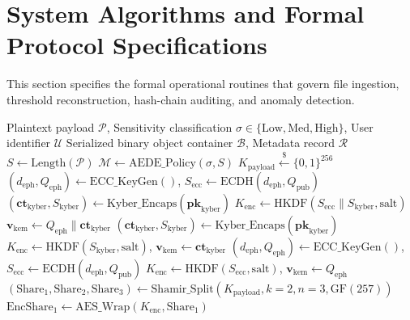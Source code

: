 \documentclass[sn-mathphys,Numbered]{sn-jnl}%
\theoremstyle{thmstyleone}%
\theoremstyle{thmstyletwo}%
\theoremstyle{thmstylethree}%
\begin{document}
\section{System Algorithms and Formal Protocol Specifications}\label{sec:algorithms}

This section specifies the formal operational routines that govern file ingestion, threshold reconstruction, hash-chain auditing, and anomaly detection.

\begin{algorithm}[!htbp]
\caption{Adaptive Quantum-Resistant File Ingestion and Key Distribution}
\label{alg:ingestion}
\begin{algorithmic}[1]
\Require Plaintext payload $\mathcal{P}$, Sensitivity classification $\sigma \in \{\text{Low}, \text{Med}, \text{High}\}$, User identifier $\mathcal{U}$
\Ensure Serialized binary object container $\mathcal{B}$, Metadata record $\mathcal{R}$
\State $S \gets \text{Length}(\mathcal{P})$
\State $\mathcal{M} \gets \text{AEDE\_Policy}(\sigma, S)$ 
\State $K_{\text{payload}} \xleftarrow{\$} \{0, 1\}^{256}$ 
    \State $(d_{\text{eph}}, Q_{\text{eph}}) \gets \text{ECC\_KeyGen}()$, $S_{\text{ecc}} \gets \text{ECDH}(d_{\text{eph}}, Q_{\text{pub}})$
    \State $(\mathbf{ct}_{\text{kyber}}, S_{\text{kyber}}) \gets \text{Kyber\_Encaps}(\mathbf{pk}_{\text{kyber}})$
    \State $K_{\text{enc}} \gets \text{HKDF}(S_{\text{ecc}} \parallel S_{\text{kyber}}, \text{salt})$
    \State $\mathbf{v}_{\text{kem}} \gets Q_{\text{eph}} \parallel \mathbf{ct}_{\text{kyber}}$
    \State $(\mathbf{ct}_{\text{kyber}}, S_{\text{kyber}}) \gets \text{Kyber\_Encaps}(\mathbf{pk}_{\text{kyber}})$
    \State $K_{\text{enc}} \gets \text{HKDF}(S_{\text{kyber}}, \text{salt})$, $\mathbf{v}_{\text{kem}} \gets \mathbf{ct}_{\text{kyber}}$
\Else
    \State $(d_{\text{eph}}, Q_{\text{eph}}) \gets \text{ECC\_KeyGen}()$, $S_{\text{ecc}} \gets \text{ECDH}(d_{\text{eph}}, Q_{\text{pub}})$
    \State $K_{\text{enc}} \gets \text{HKDF}(S_{\text{ecc}}, \text{salt})$, $\mathbf{v}_{\text{kem}} \gets Q_{\text{eph}}$
\EndIf
\State $(\text{Share}_1, \text{Share}_2, \text{Share}_3) \gets \text{Shamir\_Split}(K_{\text{payload}}, k=2, n=3, \text{GF}(257))$
\State $\text{EncShare}_1 \gets \text{AES\_Wrap}(K_{\text{enc}}, \text{Share}_1)$

\end{algorithmic}
\end{algorithm}
\end{document}
